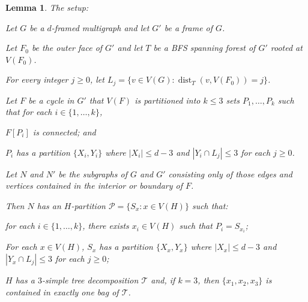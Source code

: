 \documentclass{patmorin}
\theoremstyle{plain}
\newtheorem{lem}[thm]{Lemma}
\theoremstyle{definition}
\newcommand{\note}[2]{\noindent{\color{red}[#1:~#2]}}
\DeclareMathOperator{\dist}{dist}
\newcommand{\PP}{\mathcal{P}}
\renewcommand{\ge}{\geqslant}
\renewcommand{\le}{\leqslant}
\begin{document}
\begin{lem}
	\label{induction} The setup:
	\begin{compactenum}
		\item Let $G$ be a $d$-framed multigraph and let $G'$ be a frame of $G$.
		\item Let $F_0$ be the outer face of $G'$ and let $T$ be a BFS spanning forest of $G'$ rooted at $V(F_0)$.
		\item For every integer $j\ge 0$, let $L_j=\{v\in V(G):\dist_T(v,V(F_0))=j\}$.
		\item Let $F$ be a cycle in $G'$ that $V(F)$ is partitioned into $k\le 3$ sets $P_1,\ldots,P_k$ such that for each $i\in\{1,\ldots,k\}$,
		\begin{compactenum}
			\item $F[P_i]$ is connected; and
			\item $P_i$ has a partition $\{X_i,Y_i\}$ where $|X_i|\le d-3$ and $|Y_i\cap L_j| \le 3$ for each $j\ge 0$.
		\end{compactenum}
		\item Let $N$ and $N'$ be the subgraphs of $G$ and $G'$ consisting only of those edges and vertices contained in the interior or boundary of $F$.
	\end{compactenum}
	Then $N$ has an $H$-partition $\PP=\{S_x: x\in V(H)\}$ such that:
	\begin{compactenum}[(i)]
		\item for each $i\in\{1,\ldots,k\}$, there exists $x_i\in V(H)$ such that $P_i=S_{x_i}$;
		\item For each $x\in V(H)$, $S_x$ has a partition $\{X_x,Y_x\}$ where $|X_x|\le d-3$ and $|Y_x\cap L_j|\le 3$ for each $j\ge 0$;
		\item $H$ has a $3$-simple tree decomposition $\mathcal{T}$ and, if $k=3$, then $\{x_1,x_2,x_3\}$ is contained in exactly one bag of $\mathcal{T}$.
	\end{compactenum}

\end{lem}
\end{document}
